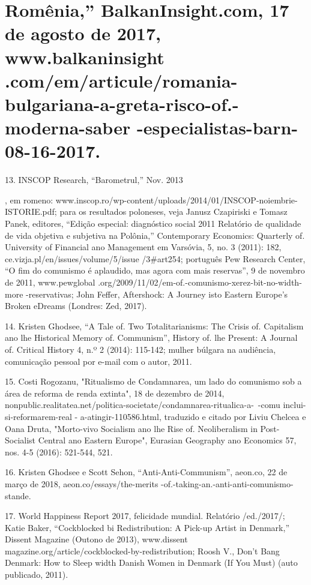 \section{Romênia,” BalkanInsight.com, 17 de agosto de 2017, www.balkaninsight .com/em/articule/romania-bulgariana-a-greta-risco-of.-moderna-saber -especialistas-barn-08-16-2017.}
 \par 
13. INSCOP Research, “Barometrul,” Nov. {\color{blue} 2013 } {\par} , em romeno: www.inscop.ro/wp-content/uploads/2014/01/INSCOP-noiembrie-ISTORIE.pdf; para os resultados poloneses, veja Janusz Czapiriski e Tomasz Panek, editores, “Edição especial: diagnóstico social 2011 Relatório de qualidade de vida objetiva e subjetiva na Polônia,” Contemporary Economics: Quarterly of. University of Financial ano Management em Varsóvia, 5, no. {\color{blue}3} (2011): 182, ce.vizja.pl/en/issues/volume/5/issue /3#art254; português Pew Research Center, “O fim do comunismo é aplaudido, mas agora com mais reservas”, {\color{blue}9} de novembro de 2011, www.pewglobal .org/2009/11/02/em-of.-comunismo-xerez-bit-no-width-more -reservativas; John Feffer, Aftershock: A Journey isto Eastern Europe’s Broken eDreams (Londres: Zed, 2017).
 \par 
14. Kristen Ghodsee, “A Tale of. Two Totalitarianisms: The Crisis of. Capitalism ano lhe Historical Memory of. Communism”, History of. lhe Present: A Journal of. Critical History 4, n.º {\color{blue}2} (2014): 115-142; mulher búlgara na audiência, comunicação pessoal por e-mail com o autor, 2011.
 \par 
15. Costi Rogozanu, "Ritualismo de Condamnarea, um lado do comunismo sob a área de reforma de renda extinta", {\color{blue}18} de dezembro de 2014, nonpublic.realitatea.net/politica-societate/condamnarea-ritualica-a-~-comu inclui-si-reformarem-real - a-atingir-110586.html, traduzido e citado por Liviu Chelcea e Oana Druta, "Morto-vivo Socialism ano lhe Rise of. Neoliberalism in Post-Socialist Central ano Eastern Europe", Eurasian Geography ano Economics 57, nos. 4-5 (2016): 521-544, {\color{blue}521}.
 \par 
16. Kristen Ghodsee e Scott Sehon, “Anti-Anti-Communism”, aeon.co, {\color{blue}22} de março de 2018, aeon.co/essays/the-merits -of.-taking-an.-anti-anti-comunismo-stande.
 \par 
17. World Happiness Report 2017, felicidade mundial. Relatório /ed./2017/; Katie Baker, “Cockblocked bi Redistribution: A Pick-up Artist in Denmark,” Dissent Magazine (Outono de 2013), www.dissent magazine.org/article/cockblocked-by-redistribution; Roosh V., Don’t Bang Denmark: How to Sleep width Danish Women in Denmark (If You Must) (auto publicado, 2011).
